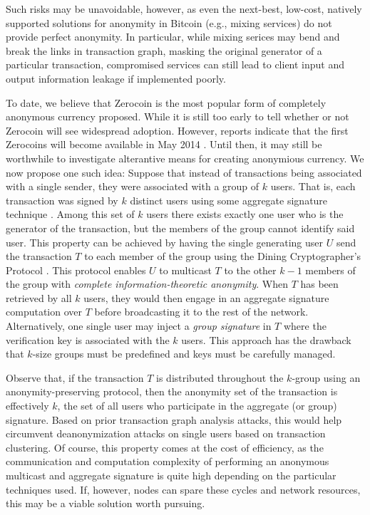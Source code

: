 Such risks may be unavoidable, however, as even the next-best, low-cost, natively supported solutions for anonymity in Bitcoin (e.g., mixing services) do not provide perfect anonymity. In particular, while mixing serices may bend and break the links in transaction graph, masking the original generator of a particular transaction, compromised services can still lead to client input and output information leakage if implemented poorly. 

To date, we believe that Zerocoin is the most popular form of completely anonymous currency proposed. While it is still too early to tell whether or not Zerocoin will see widespread adoption. However, reports indicate that the first Zerocoins will become available in May 2014 \cite{zerocoin-press}. Until then, it may still be worthwhile to investigate alterantive means for creating anonymious currency. We now propose one such idea: Suppose that instead of transactions being associated with a single sender, they were associated with a group of $k$ users. That is, each transaction was signed by $k$ distinct users using some aggregate signature technique \cite{aggrsig1}. Among this set of $k$ users there exists exactly one user who is the generator of the transaction, but the members of the group cannot identify said user. This property can be achieved by having the single generating user $U$ send the transaction $T$ to each member of the group using the Dining Cryptographer's Protocol \cite{dining}. This protocol enables $U$ to multicast $T$ to the other $k-1$ members of the group with \emph{complete information-theoretic anonymity}. When $T$ has been retrieved by all $k$ users, they would then engage in an aggregate signature computation over $T$ before broadcasting it to the rest of the network. Alternatively, one single user may inject a \emph{group signature} in $T$ where the verification key is associated with the $k$ users. This approach has the drawback that $k$-size groups must be predefined and keys must be carefully managed. 

Observe that, if the transaction $T$ is distributed throughout the $k$-group using an anonymity-preserving protocol, then the anonymity set of the transaction is effectively $k$, the set of all users who participate in the aggregate (or group) signature. Based on prior transaction graph analysis attacks, this would help circumvent deanonymization attacks on single users based on transaction clustering. Of course, this property comes at the cost of efficiency, as the communication and computation complexity of performing an anonymous multicast and aggregate signature is quite high depending on the particular techniques used. If, however, nodes can spare these cycles and network resources, this may be a viable solution worth pursuing. 

